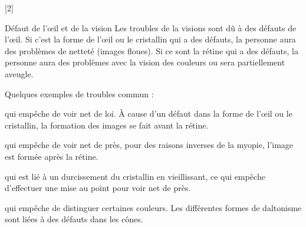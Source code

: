 [2]


\begin{doc}{Défaut de l'œil et de la vision}
  Les troubles de la visions sont dû à des défauts de l'œil.
  Si c'est la forme de l'œil ou le cristallin qui a des défauts, la personne aura des problèmes de netteté (images floues).
  Si ce sont la rétine qui a des défauts, la personne aura des problèmes avec la vision des couleurs ou sera partiellement aveugle.

  Quelques exemples de troubles commun :
  \begin{listePoints}
    \item {} qui empêche de voir net de loi. À cause d'un défaut dans la forme de l'œil ou le cristallin, la formation des images se fait avant la rétine.
    \item {} qui empêche de voir net de près, pour des raisons inverses de la myopie, l'image est formée après la rétine.
    \item {} qui est lié à un durcissement du cristallin en vieillissant, ce qui empêche d'effectuer une mise au point pour voir net de près.
    \item {} qui empêche de distinguer certaines couleurs. Les différentes formes de daltonisme sont liées à des défauts dans les cônes.
  \end{listePoints}
\end{doc}